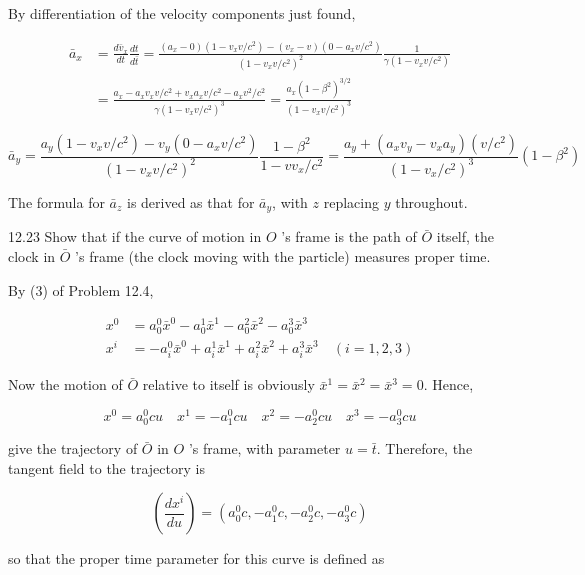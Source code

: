 \documentclass[10pt]{article}
\begin{document}
By differentiation of the velocity components just found,

$$
\begin{aligned}
\bar{a}_{x} & =\frac{d \bar{v}_{x}}{d t} \frac{d t}{d \bar{t}}=\frac{\left(a_{x}-0\right)\left(1-v_{x} v / c^{2}\right)-\left(v_{x}-v\right)\left(0-a_{x} v / c^{2}\right)}{\left(1-v_{x} v / c^{2}\right)^{2}} \frac{1}{\gamma\left(1-v_{x} v / c^{2}\right)} \\
& =\frac{a_{x}-a_{x} v_{x} v / c^{2}+v_{x} a_{x} v / c^{2}-a_{x} v^{2} / c^{2}}{\gamma\left(1-v_{x} v / c^{2}\right)^{3}}=\frac{a_{x}\left(1-\beta^{2}\right)^{3 / 2}}{\left(1-v_{x} v / c^{2}\right)^{3}}
\end{aligned}
$$

$$
\bar{a}_{y}=\frac{a_{y}\left(1-v_{x} v / c^{2}\right)-v_{y}\left(0-a_{x} v / c^{2}\right)}{\left(1-v_{x} v / c^{2}\right)^{2}} \frac{1-\beta^{2}}{1-v v_{x} / c^{2}}=\frac{a_{y}+\left(a_{x} v_{y}-v_{x} a_{y}\right)\left(v / c^{2}\right)}{\left(1-v_{x} / c^{2}\right)^{3}}\left(1-\beta^{2}\right)
$$

The formula for $\bar{a}_{z}$ is derived as that for $\bar{a}_{y}$, with $z$ replacing $y$ throughout.

12.23 Show that if the curve of motion in $O$ 's frame is the path of $\bar{O}$ itself, the clock in $\bar{O}$ 's frame (the clock moving with the particle) measures proper time.

By (3) of Problem 12.4,

$$
\begin{aligned}
x^{0} & =a_{0}^{0} \bar{x}^{0}-a_{0}^{1} \bar{x}^{1}-a_{0}^{2} \bar{x}^{2}-a_{0}^{3} \bar{x}^{3} \\
x^{i} & =-a_{i}^{0} \bar{x}^{0}+a_{i}^{1} \bar{x}^{1}+a_{i}^{2} \bar{x}^{2}+a_{i}^{3} \bar{x}^{3} \quad(i=1,2,3)
\end{aligned}
$$

Now the motion of $\bar{O}$ relative to itself is obviously $\bar{x}^{1}=\bar{x}^{2}=\bar{x}^{3}=0$. Hence,

$$
x^{0}=a_{0}^{0} c u \quad x^{1}=-a_{1}^{0} c u \quad x^{2}=-a_{2}^{0} c u \quad x^{3}=-a_{3}^{0} c u
$$

give the trajectory of $\bar{O}$ in $O$ 's frame, with parameter $u=\bar{t}$. Therefore, the tangent field to the trajectory is

$$
\left(\frac{d x^{i}}{d u}\right)=\left(a_{0}^{0} c,-a_{1}^{0} c,-a_{2}^{0} c,-a_{3}^{0} c\right)
$$

so that the proper time parameter for this curve is defined as
\end{document}
